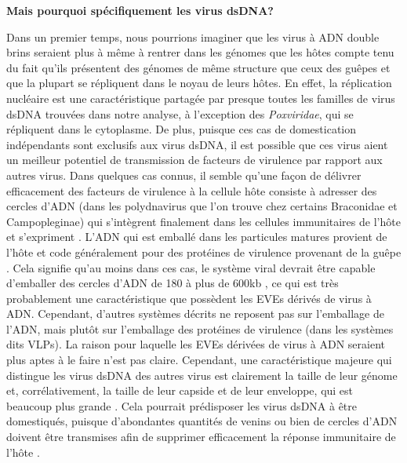\textbf{Mais pourquoi spécifiquement les virus dsDNA?}

Dans un premier temps, nous pourrions imaginer que les virus à ADN double brins seraient plus à même à rentrer dans les génomes que les hôtes compte tenu du fait qu'ils présentent des génomes de même structure que ceux des guêpes et que la plupart se répliquent dans le noyau de leurs hôtes. En effet, la réplication nucléaire est une caractéristique partagée par presque toutes les familles de virus dsDNA trouvées dans notre analyse, à l'exception des \textit{Poxviridae}, qui se répliquent dans le cytoplasme. De plus, puisque ces cas de domestication indépendants sont exclusifs aux virus dsDNA, il est possible que ces virus aient un meilleur potentiel de transmission de facteurs de virulence par rapport aux autres virus. Dans quelques cas connus, il semble qu'une façon de délivrer efficacement des facteurs de virulence à la cellule hôte consiste à adresser des cercles d'ADN (dans les polydnavirus que l'on trouve chez certains Braconidae et Campopleginae) qui s'intègrent finalement dans les cellules immunitaires de l'hôte et s'expriment \citep{chevignon_functional_2014, chevignon_cotesia_2018}. L'ADN qui est emballé dans les particules matures provient de l'hôte et code généralement pour des protéines de virulence provenant de la guêpe \citep{espagne_genome_2004,burke_widespread_2014}. Cela signifie qu'au moins dans ces cas, le système viral devrait être capable d'emballer des cercles d'ADN de 180 à plus de 600kb \citep{burke_polydnaviruses_2012}, ce qui est très probablement une caractéristique que possèdent les EVEs dérivés de virus à ADN. Cependant, d'autres systèmes décrits ne reposent pas sur l'emballage de l'ADN, mais plutôt sur l'emballage des protéines de virulence (dans les systèmes dits VLPs). La raison pour laquelle les EVEs dérivées de virus à ADN seraient plus aptes à le faire n'est pas claire. Cependant, une caractéristique majeure qui distingue les virus dsDNA des autres virus est clairement la taille de leur génome et, corrélativement, la taille de leur capside et de leur enveloppe, qui est beaucoup plus grande \citep{chaudhari_scaling_2021}. Cela pourrait prédisposer les virus dsDNA à être domestiqués, puisque d'abondantes quantités de venins ou bien de cercles d'ADN doivent être transmises afin de supprimer efficacement la réponse immunitaire de l'hôte \citep{beckage_parasitoid_2008}. \\


